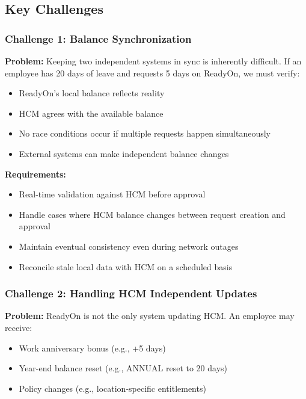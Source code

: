 \documentclass[12pt,a4paper]{article}
\begin{document}
\subsection{Key Challenges}

\subsubsection{Challenge 1: Balance Synchronization}

\textbf{Problem:} Keeping two independent systems in sync is inherently difficult. If an employee has 20 days of leave and requests 5 days on ReadyOn, we must verify:
\begin{itemize}
    \item ReadyOn's local balance reflects reality
    \item HCM agrees with the available balance
    \item No race conditions occur if multiple requests happen simultaneously
    \item External systems can make independent balance changes
\end{itemize}

\textbf{Requirements:}
\begin{itemize}
    \item Real-time validation against HCM before approval
    \item Handle cases where HCM balance changes between request creation and approval
    \item Maintain eventual consistency even during network outages
    \item Reconcile stale local data with HCM on a scheduled basis
\end{itemize}

\subsubsection{Challenge 2: Handling HCM Independent Updates}

\textbf{Problem:} ReadyOn is not the only system updating HCM. An employee may receive:
\begin{itemize}
    \item Work anniversary bonus (e.g., +5 days)
    \item Year-end balance reset (e.g., ANNUAL reset to 20 days)
    \item Policy changes (e.g., location-specific entitlements)
\end{itemize}
\end{document}
